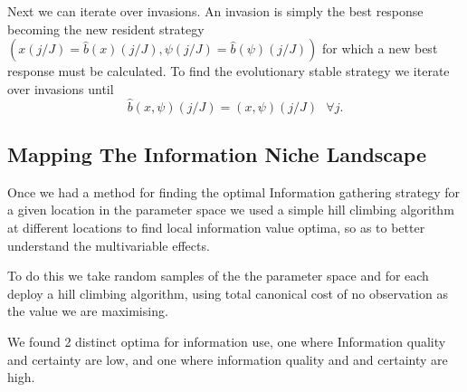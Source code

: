 \documentclass[10pt]{article}
\begin{document}
Next we can iterate over invasions. An invasion is simply the best
response becoming the new resident strategy $(x(j/J)=\hat{b}(x)(j/J),\psi(j/J)=\hat{b}(\psi)(j/J))$
for which a new best response must be calculated. To find the evolutionary
stable strategy we iterate over invasions until
\begin{equation}
	\hat{b}(x,\psi)(j/J)=(x,\psi)(j/J)\text{ }\forall j.\label{eq:-8}
\end{equation}


\subsection{Mapping The Information Niche Landscape}

Once we had a method for finding the optimal Information gathering
strategy for a given location in the parameter space we used a simple
hill climbing algorithm at different locations to find local information
value optima, so as to better understand the multivariable effects. 

To do this we take random samples of the the parameter space and for
each deploy a hill climbing algorithm, using total canonical cost
of no observation as the value we are maximising. 

We found 2 distinct optima for information use, one where Information
quality and certainty are low, and one where information quality and
and certainty are high.

\FloatBarrier

\printbibliography
\end{document}
